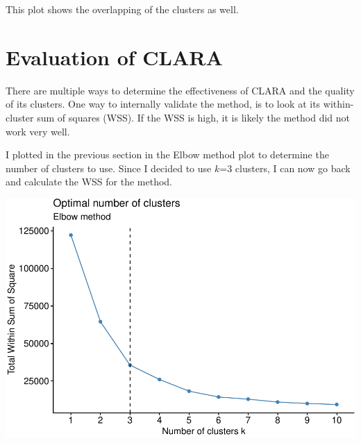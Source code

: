 \documentclass[12pt,twoside]{amherstthesis}
\begin{document}
  This plot shows the overlapping of the clusters as well.
  
  \section{Evaluation of CLARA}\label{evaluation-of-clara}
  
  There are multiple ways to determine the effectiveness of CLARA and the
  quality of its clusters. One way to internally validate the method, is
  to look at its within-cluster sum of squares (WSS). If the WSS is high,
  it is likely the method did not work very well.
  
  I plotted in the previous section in the Elbow method plot to determine
  the number of clusters to use. Since I decided to use \(k\)=3 clusters,
  I can now go back and calculate the WSS for the method.
  
  \begin{Shaded}
  \begin{Highlighting}[]
   \NormalTok{) }\OperatorTok{+}
  \StringTok{    }\NormalTok{(} \NormalTok{, } \NormalTok{)}\OperatorTok{+}
  \StringTok{  }\NormalTok{(} \NormalTok{)}
  \end{Highlighting}
  \end{Shaded}
  
  \begin{center}\includegraphics{Comps_Proj_files/figure-latex/unnamed-chunk-11-1} \end{center}
  
\end{document}
